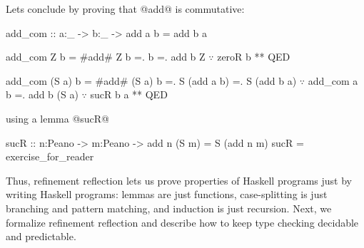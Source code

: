 %
Lets conclude by proving that @add@ is commutative:
%
\begin{mcode}
add_com :: a:_ -> b:_ -> {add a b = add b a}

add_com    Z  b =  #add# Z b
                =. b
                =. add b Z     $\because$ zeroR b
                ** QED

add_com (S a) b =  #add# (S a) b
                =. S (add a b)
                =. S (add b a) $\because$ add_com a b
                =. add b (S a) $\because$ sucR b a
                ** QED
\end{mcode}
%
using a lemma @sucR@
%
\begin{code}
  sucR :: n:Peano -> m:Peano ->
                {add n (S m) = S (add n m)}
  sucR = exercise_for_reader
\end{code}

%

Thus, refinement reflection lets us prove properties of Haskell programs
just by writing Haskell programs: lemmas are just functions, case-splitting
is just branching and pattern matching, and induction is just recursion.
%
Next, we formalize refinement reflection and describe
how to keep type checking decidable and predictable.
